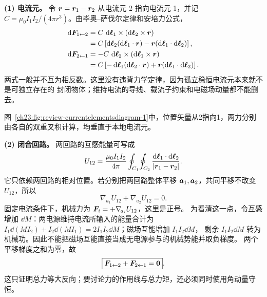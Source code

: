 {\begin{xesolution}
\textbf{(1) 电流元。} 令 $\bm{r}=\bm{r}_1-\bm{r}_2$ 从电流元 2 指向电流元 1，并记
$C=\mu_0I_1I_2/(4\pi r^3)$。由毕奥--萨伐尔定律和安培力公式，
\begin{align}
  \dd\vect F_{1\leftarrow2}
  &=C\,\dd\vect\ell_1\times(\dd\vect\ell_2\times\vect r)\\
  &=C\left[\dd\vect\ell_2(\dd\vect\ell_1\cdot\vect r)
  -\vect r(\dd\vect\ell_1\cdot\dd\vect\ell_2)\right],\\
  \dd\vect F_{2\leftarrow1}
  &=-C\,\dd\vect\ell_2\times(\dd\vect\ell_1\times\vect r)\\
  &=C\left[-\dd\vect\ell_1(\dd\vect\ell_2\cdot\vect r)
  +\vect r(\dd\vect\ell_1\cdot\dd\vect\ell_2)\right].
\end{align}
两式一般并不互为相反数。这里没有违背力学定律，因为孤立稳恒电流元本来就不是可独立存在的
封闭物体；维持电流的导线、载流子约束和电磁场动量都不能删去。

图~\ref{ch23:fig:review-currentelementsdiagram-1}中，位置矢量从2指向1，两力分别由各自的双重叉积计算，均垂直于本地电流元。
\par\noindent\begin{minipage}{\linewidth}
\currentElementsDiagram
{}
\end{minipage}\par\medskip

\textbf{(2) 闭合回路。} 两回路的互感能量可写成
\begin{equation}
  U_{12}=\frac{\mu_0I_1I_2}{4\pi}
  \oint_{C_1}\!\oint_{C_2}
  \frac{\mathop{}\!\mathrm d\bm{\ell}_1\cdot\mathop{}\!\mathrm d\bm{\ell}_2}{|\bm{r}_1-\bm{r}_2|}.
\end{equation}
它只依赖两回路的相对位置。若分别把两回路整体平移 $\bm{a}_1,\bm{a}_2$，共同平移不改变
$U_{12}$，所以
\[
  \nabla_{\!a_1}U_{12}+\nabla_{\!a_2}U_{12}=0.
\]
固定电流条件下，机械力为 $\bm{F}_i=+\nabla_{\!a_i}U_{12}$，这里是正号。
为看清这一点，令互感增加 $\dd M$：两电源维持电流所输入的能量合计为
$I_1\dd(MI_2)+I_2\dd(MI_1)=2I_1I_2\dd M$；磁场互能增加 $I_1I_2\dd M$，
剩余 $I_1I_2\dd M$ 转为机械功。因此不能把磁场互能直接当成无电源参与的机械势能并取负梯度。
两个平移梯度之和为零，故
\begin{equation}
  \boxed{\bm{F}_{1\leftarrow2}+\bm{F}_{2\leftarrow1}=\bm{0}}.
\end{equation}
这只证明总力等大反向；要讨论力的作用线与总力矩，还必须同时使用角动量守恒。
\end{xesolution}



}
